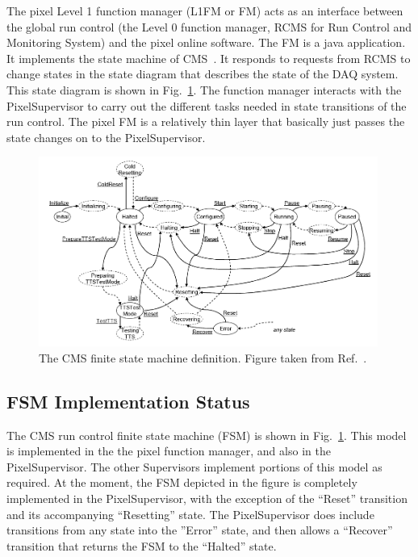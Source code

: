 
The pixel Level 1 function manager (L1FM or FM) acts as an interface 
between the global run control (the Level 0 function manager, RCMS 
for Run Control and Monitoring System) and the pixel online 
software.  The FM is a java application.  It implements the state 
machine of CMS~\cite{statemachine}.  It responds to requests from 
RCMS to change states in the state diagram that describes the state 
of the DAQ system.  This state diagram is shown in 
Fig.~\ref{fig:l1fm}.  The function manager interacts with the 
PixelSupervisor to carry out the different tasks needed in state 
transitions of the run control.  The pixel FM is a relatively thin 
layer that basically just passes the state changes on to the 
PixelSupervisor.

\begin{figure}
\begin{center}
\includegraphics[width=0.99\textwidth]{l1fm_states.png}
\end{center}
\caption{The CMS finite state machine definition. Figure taken from Ref.~\cite{statemachine}.}
\label{fig:l1fm}
\end{figure}

\subsection{FSM Implementation Status}
The CMS run control finite state machine (FSM) is shown in
Fig.~\ref{fig:l1fm}. This model is implemented in the the pixel
function manager, and also in the PixelSupervisor. The other
Supervisors implement portions of this model as required. At the
moment, the FSM depicted in the figure is completely implemented in
the PixelSupervisor, with the exception of the ``Reset'' transition
and its accompanying ``Resetting'' state. The PixelSupervisor does
include transitions from any state into the ''Error'' state, and then
allows a ``Recover'' transition that returns the FSM to the ``Halted''
state.


